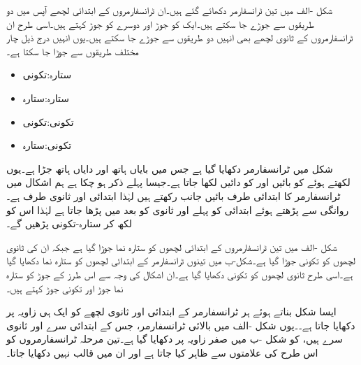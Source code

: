 شکل -الف میں تین ٹرانسفارمر دکھائے گئے ہیں۔ان ٹرانسفارمروں کے ابتدائی لچھے آپس میں دو طریقوں سے جوڑے جا سکتے ہیں۔ایک کو  جوڑ   اور دوسرے کو  جوڑ     کہتے ہیں۔اسی طرح ان ٹرانسفارمروں کے ثانوی  لچھے بھی انہیں دو طریقوں سے جوڑے جا سکتے ہیں۔یوں انہیں درج ذیل چار مختلف طریقوں سے جوڑا جا سکتا ہے۔
\begin{itemize}
\item
ستارہ:تکونی  \quad {}
\item
ستارہ:ستارہ \quad  {}
\item
تکونی:تکونی \quad  {}
\item
تکونی:ستارہ  \quad  {}
\end{itemize}

شکل  میں  ٹرانسفارمر دکھایا گیا ہے جس میں بایاں ہاتھ  اور دایاں ہاتھ  جڑا ہے۔یوں  لکھتے ہوئے  کو بائیں اور  کو دائیں لکھا جاتا ہے۔جیسا پہلے ذکر ہو چکا ہے ہم  اشکال میں ٹرانسفارمر کا ابتدائی طرف  بائیں جانب رکھتے ہیں لہٰذا  ابتدائی اور  ثانوی طرف ہے۔ روانگی سے پڑھتے ہوئے ابتدائی کو پہلے اور ثانوی کو بعد میں پڑھا جاتا ہے لہٰذا اس کو  لکھ کر  ستارہ-تکونی پڑھیں گے۔

شکل -الف میں تین ٹرانسفارمروں کے ابتدائی لچھوں کو ستارہ نما جوڑا گیا ہے جبکہ ان کی ثانوی لچھوں کو تکونی جوڑا گیا ہے۔شکل-ب میں تینوں ٹرانسفارمر کے ابتدائی لچھوں کو  ستارہ نما  دکھایا گیا ہے۔اسی طرح ثانوی لچھوں کو تکونی  دکھایا گیا ہے۔ان اشکال کی وجہ سے اس طرز کے جوڑ  کو ستارہ نما جوڑ اور تکونی جوڑ کہتے ہیں۔

ایسا شکل بناتے ہوئے ہر ٹرانسفارمر کے  ابتدائی اور ثانوی لچھے کو ایک ہی زاویہ پر دکھایا جاتا ہے۔۔یوں شکل -الف میں بالائی ٹرانسفارمر، جس کے ابتدائی سرے  اور ثانوی  سرے  ہیں، کو شکل -ب میں صفر زاویہ پر دکھایا  گیا ہے۔تین  مرحلہ ٹرانسفارمروں کو اس طرح کی علامتوں سے ظاہر کیا جاتا ہے اور ان میں قالب نہیں دکھایا جاتا۔

